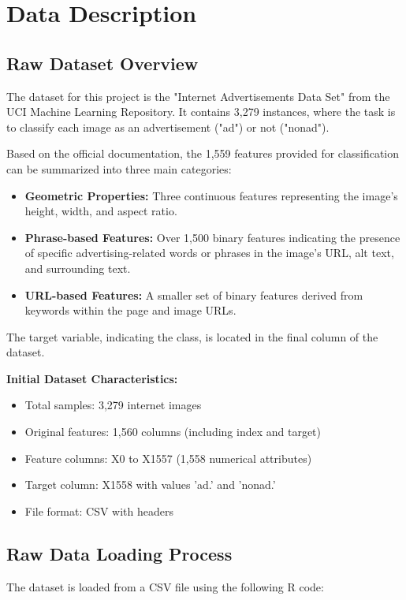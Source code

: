 \section{Data Description}
\label{sec:data_description}

\subsection{Raw Dataset Overview}
The dataset for this project is the "Internet Advertisements Data Set" from the UCI Machine Learning Repository. It contains 3,279 instances, where the task is to classify each image as an advertisement ("ad") or not ("nonad").

Based on the official documentation, the 1,559 features provided for classification can be summarized into three main categories:
\begin{itemize}
    \item \textbf{Geometric Properties:} Three continuous features representing the image's height, width, and aspect ratio.
    \item \textbf{Phrase-based Features:} Over 1,500 binary features indicating the presence of specific advertising-related words or phrases in the image's URL, alt text, and surrounding text.
    \item \textbf{URL-based Features:} A smaller set of binary features derived from keywords within the page and image URLs.
\end{itemize}

The target variable, indicating the class, is located in the final column of the dataset.

\textbf{Initial Dataset Characteristics:}
\begin{itemize}
    \item Total samples: 3,279 internet images
    \item Original features: 1,560 columns (including index and target)
    \item Feature columns: X0 to X1557 (1,558 numerical attributes)
    \item Target column: X1558 with values 'ad.' and 'nonad.'
    \item File format: CSV with headers
\end{itemize}

\subsection{Raw Data Loading Process}
The dataset is loaded from a CSV file using the following R code:

